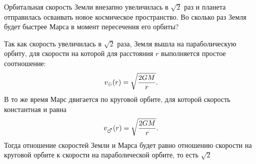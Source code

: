 \documentclass[12pt,a4paper]{article}
\begin{document}
\begin{task}{1}
    Орбитальная скорость Земли внезапно увеличилась в $\sqrt{2}$ раз и планета отправилась осваивать новое космическое пространство. Во сколько раз Земля будет быстрее Марса в момент пересечения его орбиты?
\end{task}

\begin{solution}
    Так как скорость увеличилась в $\sqrt{2}$ раза, Земля вышла на параболическую орбиту, для скорости на которой для расстояния $r$ выполняется простое соотношение:
    $$
    v_{\oplus}(r) = \sqrt{\frac{2GM}{r}}.
    $$
    В то же время Марс двигается по круговой орбите, для которой скорость константная и равна
    $$
    v_{\mars}(r) = \sqrt{\frac{2GM}{r}}.
    $$
    Тогда отношение скоростей Земли и Марса будет равно отношению скорости на круговой орбите к скорости на параболической орбите, то есть $\sqrt{2}$
\end{solution}

\end{document}
